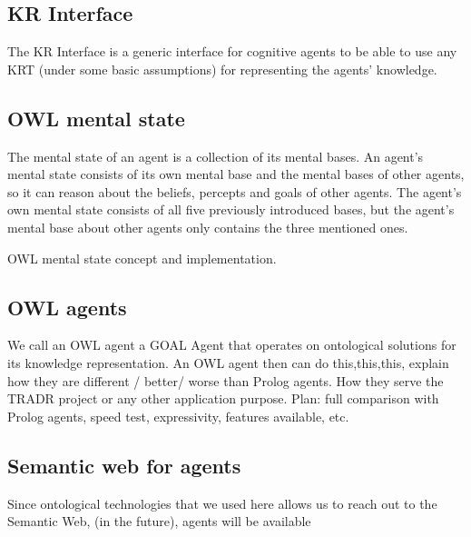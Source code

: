 \subsection{KR Interface}

The KR Interface is a generic interface for cognitive agents to be able to use any KRT (under some basic assumptions) for representing the agents' knowledge. 


\subsection{OWL mental state}

The mental state of an agent is a collection of its mental bases. An agent's mental state consists of its own mental base and the mental bases of other agents, so it can reason about the beliefs, percepts and goals of other agents. The agent's own mental state consists of all five previously introduced bases, but the agent's mental base about other agents only contains the three mentioned ones. 

OWL mental state concept and implementation.

\subsection{OWL agents}

We call an OWL agent a GOAL Agent that operates on ontological solutions for its knowledge representation. An OWL agent then can do this,this,this, explain how they are different / better/ worse than Prolog agents. How they serve the TRADR project or any other application purpose. 
Plan: full comparison with Prolog agents, speed test, expressivity, features available, etc.

\subsection{Semantic web for agents}

Since ontological technologies that we used here allows us to reach out to the Semantic Web,
(in the future), agents will be available 



